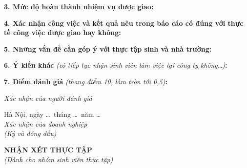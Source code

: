 \noindent\textbf{3. Mức độ hoàn thành nhiệm vụ được giao:}\par\vspace{0.15cm}
\answerline
\answerline

\noindent\textbf{4. Xác nhận công việc và kết quả nêu trong báo cáo có đúng với
thực tế công việc được giao hay không:}\par\vspace{0.15cm}
\answerline
\answerline

\noindent\textbf{5. Những vấn đề cần góp ý với thực tập sinh và nhà trường:}\par\vspace{0.15cm}
\answerline
\answerline

\noindent\textbf{6. Ý kiến khác} \textit{(có tiếp tục nhận sinh viên làm việc tại
công ty không\dots)}\textbf{:}\par\vspace{0.15cm}
\answerline

\noindent\textbf{7. Điểm đánh giá} \textit{(thang điểm 10, làm tròn tới 0{,}5)}\textbf{:}
\dotfill

\vspace{1.2cm}

\noindent
\begin{minipage}[t]{0.48\textwidth}
\centering
\textit{Xác nhận của người đánh giá}\\[2.4cm]
\dotfill
\end{minipage}
\hfill
\begin{minipage}[t]{0.48\textwidth}
\centering
Hà Nội, ngày \dots\ tháng \dots\ năm \dots\\[0.15cm]
\textit{Xác nhận của doanh nghiệp}\\
\textit{(Ký và đóng dấu)}\\[2cm]
\dotfill
\end{minipage}

\iffalse

\clearpage
\thispagestyle{empty}

\begin{center}
{\large\bfseries NHẬN XÉT THỰC TẬP}\\[0.2cm]
{\itshape (Dành cho nhóm sinh viên thực tập)}
\end{center}

